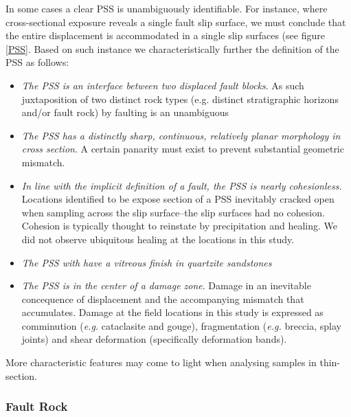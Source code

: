 \documentclass[12pt,a4paper]{article}
\begin{document}
{In some cases a clear PSS is unambiguously identifiable. For instance, where cross-sectional exposure reveals a single fault slip surface, we must conclude that the entire displacement is accommodated in a single slip surfaces (see figure \ref{PSS}. Based on such instance we characteristically further the definition of the PSS as follows:

\begin{itemize}

	\item \textit{The PSS is an interface between two displaced fault blocks}. As such juxtaposition of two distinct rock types (e.g. distinct stratigraphic horizons and/or fault rock) by faulting is an unambiguous 
	
	\item \textit{The PSS has a distinctly sharp, continuous, relatively planar morphology in cross section}. A certain panarity must exist to prevent substantial geometric mismatch.
	
	\item \textit{In line with the implicit definition of a fault, the PSS is nearly cohesionless.} Locations identified to be expose section of a PSS inevitably cracked open when sampling across the slip surface--the slip surfaces had no cohesion. Cohesion is typically thought to reinstate by precipitation and healing. We did not observe ubiquitous healing at the locations in this study.
	
	\item \textit{The PSS with have a vitreous finish in quartzite sandstones}
	
	\item \textit{The PSS is in the center of a damage zone}. Damage in an inevitable concequence of displacement and the accompanying mismatch that accumulates. Damage at the field locations in this study is expressed as comminution (\textit{e.g.} cataclasite and gouge), fragmentation (\textit{e.g.} breccia, splay joints) and shear deformation (specifically deformation bands).
	
\end{itemize}

More characteristic features may come to light when analysing samples in thin-section.

\subsubsection{Fault Rock} 


}
\end{document}
